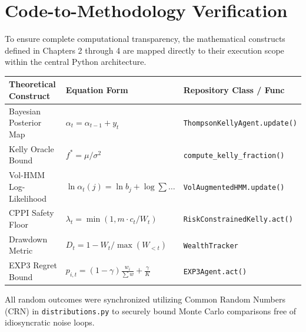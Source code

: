 \appendix
\chapter{Code-to-Methodology Verification}

To ensure complete computational transparency, the mathematical constructs defined in Chapters 2 through 4 are mapped directly to their execution scope within the central Python architecture. 

\begin{table}[h]
\centering
\renewcommand{\arraystretch}{1.5}
\begin{tabular}{p{} p{} p{}}
\hline
\textbf{Theoretical Construct} & \textbf{Equation Form} & \textbf{Repository Class / Func} \\ \hline
Bayesian Posterior Map & $\alpha_t = \alpha_{t-1} + y_t$ & \texttt{ThompsonKellyAgent.update()} \\
Kelly Oracle Bound & $f^* = \mu / \sigma^2$ & \texttt{compute\_kelly\_fraction()} \\
Vol-HMM Log-Likelihood & $\ln \alpha_t(j) = \ln b_j + \log\sum \dots$ & \texttt{VolAugmentedHMM.update()} \\
CPPI Safety Floor & $\lambda_t = \min(1, m \cdot c_t / W_t)$ & \texttt{RiskConstrainedKelly.act()} \\
Drawdown Metric & $D_t = 1 - W_t / \max(W_{<t})$ & \texttt{WealthTracker} \\
EXP3 Regret Bound & $p_{i,t} = (1-\gamma) \frac{w_i}{\sum w} + \frac{\gamma}{K}$ & \texttt{EXP3Agent.act()} \\
\hline
\end{tabular}
\end{table}

All random outcomes were synchronized utilizing Common Random Numbers (CRN) in \texttt{distributions.py} to securely bound Monte Carlo comparisons free of idiosyncratic noise loops.
